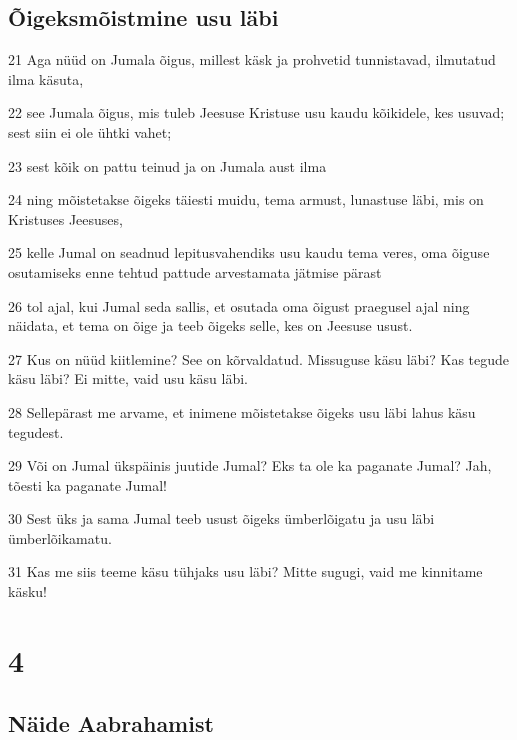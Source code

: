 \section*{Õigeksmõistmine usu läbi}

\par 21 Aga nüüd on Jumala õigus, millest käsk ja prohvetid tunnistavad, ilmutatud ilma käsuta,
\par 22 see Jumala õigus, mis tuleb Jeesuse Kristuse usu kaudu kõikidele, kes usuvad; sest siin ei ole ühtki vahet;
\par 23 sest kõik on pattu teinud ja on Jumala aust ilma
\par 24 ning mõistetakse õigeks täiesti muidu, tema armust, lunastuse läbi, mis on Kristuses Jeesuses,
\par 25 kelle Jumal on seadnud lepitusvahendiks usu kaudu tema veres, oma õiguse osutamiseks enne tehtud pattude arvestamata jätmise pärast
\par 26 tol ajal, kui Jumal seda sallis, et osutada oma õigust praegusel ajal ning näidata, et tema on õige ja teeb õigeks selle, kes on Jeesuse usust.
\par 27 Kus on nüüd kiitlemine? See on kõrvaldatud. Missuguse käsu läbi? Kas tegude käsu läbi? Ei mitte, vaid usu käsu läbi.
\par 28 Sellepärast me arvame, et inimene mõistetakse õigeks usu läbi lahus käsu tegudest.
\par 29 Või on Jumal ükspäinis juutide Jumal? Eks ta ole ka paganate Jumal? Jah, tõesti ka paganate Jumal!
\par 30 Sest üks ja sama Jumal teeb usust õigeks ümberlõigatu ja usu läbi ümberlõikamatu.
\par 31 Kas me siis teeme käsu tühjaks usu läbi? Mitte sugugi, vaid me kinnitame käsku!



\chapter{4}

\section*{Näide Aabrahamist}

